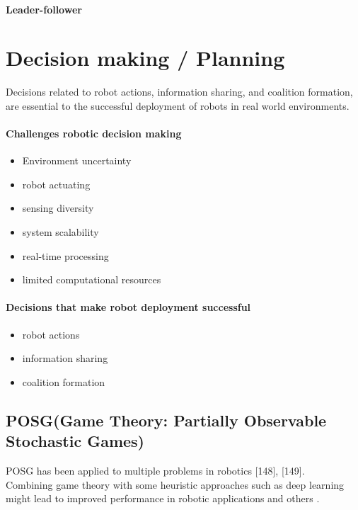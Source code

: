\documentclass{article}
\begin{document}
    	\paragraph{Leader-follower}
    \section{Decision making / Planning} 
    	Decisions related to robot actions, information sharing, and coalition formation, are essential to the successful deployment of robots in real world environments.
    	
    	\paragraph{Challenges robotic decision making}
    		\begin{itemize}
    			\item Environment uncertainty
    			\item robot actuating
    			\item sensing diversity
    			\item system scalability
    			\item real-time processing
    			\item limited computational resources
    		\end{itemize}
   		\paragraph{Decisions that make robot deployment successful}
   			\begin{itemize}
   				\item  robot actions
   				\item  information sharing
   				\item  coalition formation
   			\end{itemize}
   		
   		
   		\subsection{POSG(Game Theory: Partially Observable Stochastic Games)}
   		POSG has been applied to multiple problems in robotics \citet{rizk-2019-cooperative-heterogeneous-multi-robot-systems-a-survey}[148], \citet{rizk-2019-cooperative-heterogeneous-multi-robot-systems-a-survey}[149]. 
   		\\
   		Combining game theory with some heuristic approaches such as deep learning might lead to improved performance in robotic applications and others \citep{rizk-2018-decision-making-in-multiagent-systems-a-survey}.
   		
\end{document}

